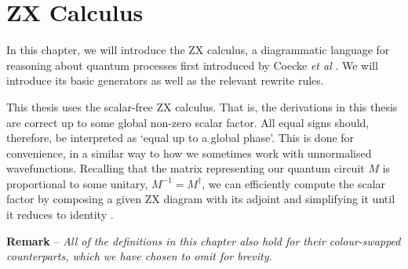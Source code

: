 \chapter{ZX Calculus}%
\label{zx-calculus}

In this chapter, we will introduce the ZX calculus, a diagrammatic language for reasoning about quantum processes first introduced by Coecke \textit{et al} \cite{Coecke2011}. We will introduce its basic generators as well as the relevant rewrite rules.

This thesis uses the scalar-free ZX calculus. That is, the derivations in this thesis are correct up to some global non-zero scalar factor. All equal signs should, therefore, be interpreted as `equal up to a global phase'. This is done for convenience, in a similar way to how we sometimes work with unnormalised wavefunctions. Recalling that the matrix representing our quantum circuit $M$ is proportional to some unitary, $M^{-1} = M^\dagger$, we can efficiently compute the scalar factor by composing a given ZX diagram with its adjoint and simplifying it until it reduces to identity \cite{Wetering2020}.

\hangindent=10pt 
\textbf{Remark} -- \textit{All of the definitions in this chapter also hold for their colour-swapped counterparts, which we have chosen to omit for brevity.}

